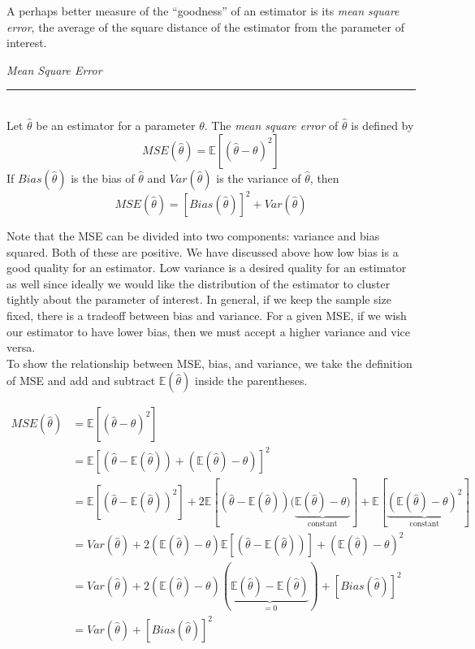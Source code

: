 \documentclass[12pt]{article}
\theoremstyle{definition}
\theoremstyle{remark}
\def\E{{\mathbb E}}
\begin{document}
A perhaps better measure of the ``goodness'' of an estimator is its \emph{mean square error}, the average of the square distance of the estimator from the parameter of interest.

\begin{framed}
\emph{Mean Square Error}\\
  \rule{\dimexpr{}\fboxrule}{.1pt} \\
Let $\hat{\theta}$ be an estimator for a parameter $\theta$. The \emph{mean square error} of $\hat{\theta}$ is defined by
\[
MSE(\hat{\theta}) = \E[ (\hat{\theta} - \theta)^2]
\]
If $Bias(\hat{\theta})$ is the bias of $\hat{\theta}$ and $Var(\hat{\theta})$ is the variance of $\hat{\theta}$, then
\[
MSE(\hat{\theta}) = [Bias(\hat{\theta})]^2 + Var(\hat{\theta})
\] 
\end{framed}
Note that the MSE can be divided into two components: variance and bias squared. Both of these are positive. We have discussed above how low bias is a good quality for an estimator. Low variance is a desired quality for an estimator as well since ideally we would like the distribution of the estimator to cluster tightly about the parameter of interest. In general, if we keep the sample size fixed, there is a tradeoff between bias and variance. For a given MSE, if we wish our estimator to have lower bias, then we must accept a higher variance and vice versa.\\

To show the relationship between MSE, bias, and variance, we take the definition of MSE and add and subtract $\E(\hat{\theta})$ inside the parentheses.

\begin{align*}
MSE(\hat{\theta}) &= \E[ (\hat{\theta} - \theta)^2 ] \\
&= \E[ (\hat{\theta} - \E(\hat{\theta})) + (\E(\hat{\theta}) - \theta)]^2 \\
&= \E[ (\hat{\theta} - \E(\hat{\theta}))^2] + 2 \E [ (\hat{\theta} - \E(\hat{\theta})) (\underbrace{\E(\hat{\theta}) - \theta)}_{\text{constant}} ] + \E[ \underbrace{(\E(\hat{\theta}) - \theta)^2}_{\text{constant}} ] \\
&= Var(\hat{\theta} ) + 2 (\E(\hat{\theta}) - \theta) \E [ (\hat{\theta} - \E(\hat{\theta})) ] + (\E(\hat{\theta}) - \theta)^2\\
&= Var(\hat{\theta} ) + 2 (\E(\hat{\theta}) - \theta) (\underbrace{\E(\hat{\theta}) - \E(\hat{\theta})}_{=0}) + [Bias(\hat{\theta})]^2 \\
&= Var(\hat{\theta} ) + [Bias(\hat{\theta})]^2
\end{align*}
\end{document}
